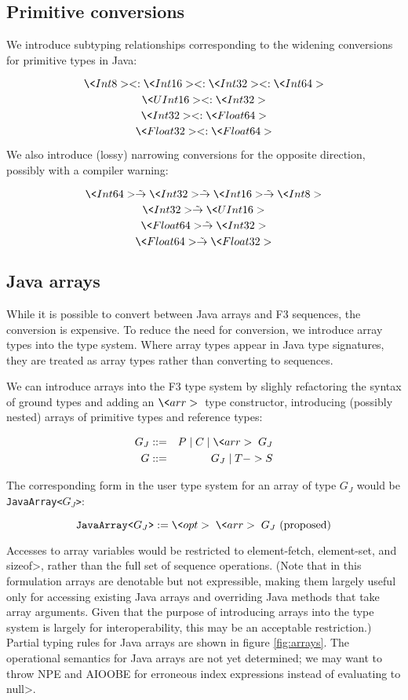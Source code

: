 \documentclass{article}
\newcommand{\convertsto}{\mathrel{\tilde{\rightarrow}}}
\newcommand{\opt}{\<opt>\;}
\newcommand{\arr}{\<arr>\;}
\newcommand{\alt}{\;|\;}
\begin{document}
\subsection{Primitive conversions}

We introduce subtyping relationships corresponding to the
widening conversions for primitive types in Java:

\[ \<Int8> <: \<Int16> <: \<Int32> <: \<Int64> \]
\[ \<UInt16> <: \<Int32> \]
\[ \<Int32> <: \<Float64> \]
\[ \<Float32> <: \<Float64> \]

We also introduce (lossy) narrowing conversions for the opposite
direction, possibly with a compiler warning:

\[ \<Int64> \convertsto \<Int32> \convertsto \<Int16> \convertsto \<Int8> \]
\[ \<Int32> \convertsto \<UInt16> \]
\[ \<Float64> \convertsto \<Int32> \]
\[ \<Float64> \convertsto \<Float32> \]


\subsection{Java arrays}

While it is possible to convert between Java arrays and F3
sequences, the conversion is expensive.  To reduce the need for
conversion, we introduce array types into the type system.  Where
array types appear in Java type signatures, they are treated as array
types rather than converting to sequences.  

We can introduce arrays into the F3 type system by slighly refactoring the 
syntax of ground types and adding an $\arr$ type constructor, introducing (possibly nested)
arrays of primitive types and reference types: 

\begin{eqnarray*}
      G_{J} &::=& P \alt C \alt \arr G_{J} \\
      G &::=& G_{J} \alt T -> S \\
\end{eqnarray*}

The corresponding form in the user type system for an array of type $G_{J}$ would be
\texttt{JavaArray<$G_{J}$>}:

\[
  \texttt{JavaArray<$G_{J}$>} := \opt \arr G_{J} \textrm{ (proposed)} \\
\]

Accesses to array variables
would be restricted to element-fetch, element-set, and \<sizeof>,
rather than the full set of sequence operations.  (Note that in this
formulation arrays are denotable but not expressible, making them
largely useful only for accessing existing Java arrays and overriding
Java methods that take array arguments.  Given that the purpose of
introducing arrays into the type system is largely for
interoperability, this may be an acceptable restriction.)  
Partial typing rules for Java arrays are shown in figure \ref{fig:arrays}.  
The operational semantics for Java arrays are not yet determined; we may
want to throw NPE and AIOOBE for erroneous index expressions instead of
evaluating to \<null>.  
\end{document}
